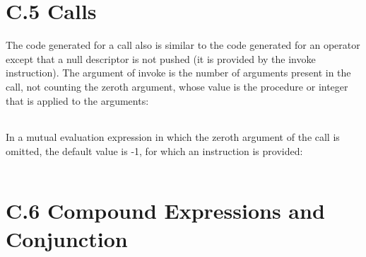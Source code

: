 \begin{noIndex}
\begin{center}
\begin{xtabular}{|m{1.9073598in}|m{2.75596in}|}
\end{xtabular}
\end{center}


\section[C.5 Calls]{C.5 Calls}

The code generated for a call also is similar to the code generated
for an operator except that a null descriptor is not pushed (it is
provided by the invoke instruction). The argument of invoke is the
number of arguments present in the call, not counting the zeroth
argument, whose value is the procedure or integer that is applied to
the arguments:

\begin{center}
\tablelasttail{\hline}
\begin{xtabular}{|m{1.9073598in}|m{2.75596in}|}

\end{xtabular}
\end{center}

In a mutual evaluation expression in which the zeroth argument of the
{\textquotedbl}call{\textquotedbl} is omitted, the default value is
-1, for which an instruction is provided:

\begin{center}
\tablelasttail{\hline}
\begin{xtabular}{|m{1.9073598in}|m{2.75596in}|}

\end{xtabular}
\end{center}


\section[C.6 Compound Expressions and Conjunction]{C.6 Compound Expressions and Conjunction}


\end{noIndex}
